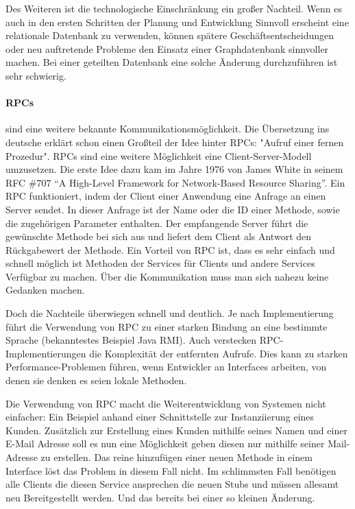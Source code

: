 \documentclass[12pt,a4paper,bibliography=totocnumbered,listof=totocnumbered]{scrartcl}
\begin{document}
Des Weiteren ist die technologische Einschränkung ein großer Nachteil. Wenn es auch in den ersten Schritten der Planung und Entwicklung Sinnvoll erscheint eine relationale Datenbank zu verwenden, können spätere Geschäftsentscheidungen oder neu auftretende Probleme den Einsatz einer Graphdatenbank sinnvoller machen. Bei einer geteilten Datenbank eine solche Änderung durchzuführen ist sehr schwierig\cite[S.85]{buildingms}.

\paragraph{\acf{RPC}s}\label{rpcpara} sind eine weitere bekannte Kommunikationsmöglichkeit. Die Übersetzung ins deutsche erklärt schon einen Großteil der Idee hinter \ac{RPC}s: "Aufruf einer fernen Prozedur". \ac{RPC}s sind eine weitere Möglichkeit eine Client-Server-Modell umzusetzen. Die erste Idee dazu kam im Jahre 1976 von James White in seinem RFC \#707 \enquote{A High-Level Framework for Network-Based Resource Sharing}\cite{white707}. Ein \ac{RPC} funktioniert, indem der Client einer Anwendung eine Anfrage an einen Server sendet. In dieser Anfrage ist der Name oder die ID einer Methode, sowie die zugehörigen Parameter enthalten. Der empfangende Server führt die gewünschte Methode bei sich aus und liefert dem Client als Antwort den Rückgabewert der Methode.
Ein Vorteil von RPC ist, dass es sehr einfach und schnell möglich ist Methoden der Services für Clients und andere Services Verfügbar zu machen. Über die Kommunikation muss man sich nahezu keine Gedanken machen\cite[S.91]{buildingms}.

Doch die Nachteile überwiegen schnell und deutlich. Je nach Implementierung führt die Verwendung von RPC zu einer starken Bindung an eine bestimmte Sprache (bekanntestes Beispiel Java RMI). Auch verstecken RPC-Implementierungen die Komplexität der entfernten Aufrufe. Dies kann zu starken Performance-Problemen führen, wenn Entwickler an Interfaces arbeiten, von denen sie denken es seien lokale Methoden\cite[S.93]{buildingms}.

Die Verwendung von RPC macht die Weiterentwicklung von Systemen nicht einfacher: Ein Beispiel anhand einer Schnittstelle zur Instanziierung eines Kunden. Zusätzlich zur Erstellung eines Kunden mithilfe seines Namen und einer E-Mail Adresse soll es nun eine Möglichkeit geben diesen nur mithilfe seiner Mail-Adresse zu erstellen. Das reine hinzufügen einer neuen Methode in einem Interface löst das Problem in diesem Fall nicht. Im schlimmsten Fall benötigen alle Clients die diesen Service ansprechen die neuen Stubs und müssen allesamt neu Bereitgestellt werden\cite[S.94]{buildingms}. Und das bereits bei einer so kleinen Änderung.
\end{document}
